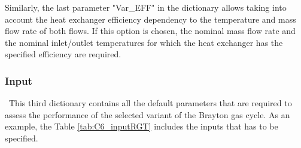 Similarly, the last parameter "Var\_EFF" in the dictionary allows taking into account the heat exchanger efficiency dependency to the temperature and mass flow rate of both flows. If this option is chosen, the nominal mass flow rate and the nominal inlet/outlet temperatures for which the heat exchanger has the specified efficiency are required.

\subsubsection{Input}
\quad\ This third dictionary contains all the default parameters that are required to assess the performance of the selected variant of the Brayton gas cycle. As an example, the Table \ref{tab:C6_inputRGT} includes the inputs that has to be specified.

\begin{longtable}[c]{@{}llc@{}}


\end{longtable}
